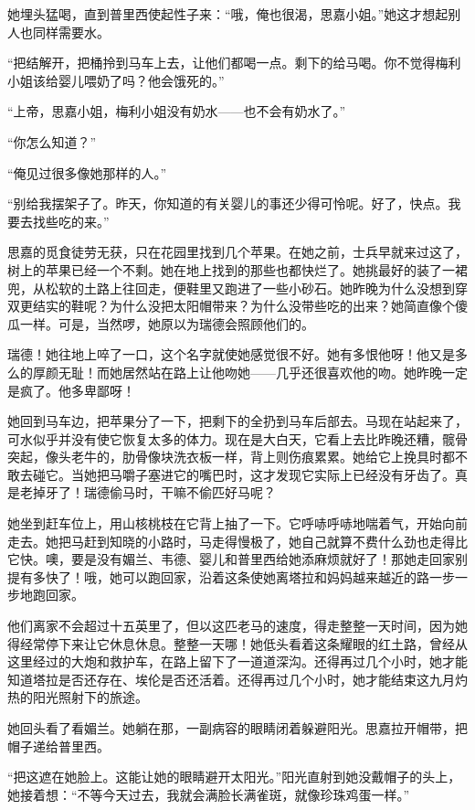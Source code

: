 \par 她埋头猛喝，直到普里西使起性子来：“哦，俺也很渴，思嘉小姐。”她这才想起别人也同样需要水。
\par “把结解开，把桶拎到马车上去，让他们都喝一点。剩下的给马喝。你不觉得梅利小姐该给婴儿喂奶了吗？他会饿死的。”
\par “上帝，思嘉小姐，梅利小姐没有奶水——也不会有奶水了。”
\par “你怎么知道？”
\par “俺见过很多像她那样的人。”
\par “别给我摆架子了。昨天，你知道的有关婴儿的事还少得可怜呢。好了，快点。我要去找些吃的来。”
\par 思嘉的觅食徒劳无获，只在花园里找到几个苹果。在她之前，士兵早就来过这了，树上的苹果已经一个不剩。她在地上找到的那些也都快烂了。她挑最好的装了一裙兜，从松软的土路上往回走，便鞋里又跑进了一些小砂石。她昨晚为什么没想到穿双更结实的鞋呢？为什么没把太阳帽带来？为什么没带些吃的出来？她简直像个傻瓜一样。可是，当然啰，她原以为瑞德会照顾他们的。
\par 瑞德！她往地上啐了一口，这个名字就使她感觉很不好。她有多恨他呀！他又是多么的厚颜无耻！而她居然站在路上让他吻她——几乎还很喜欢他的吻。她昨晚一定是疯了。他多卑鄙呀！
\par 她回到马车边，把苹果分了一下，把剩下的全扔到马车后部去。马现在站起来了，可水似乎并没有使它恢复太多的体力。现在是大白天，它看上去比昨晚还糟，髋骨突起，像头老牛的，肋骨像块洗衣板一样，背上则伤痕累累。她给它上挽具时都不敢去碰它。当她把马嚼子塞进它的嘴巴时，这才发现它实际上已经没有牙齿了。真是老掉牙了！瑞德偷马时，干嘛不偷匹好马呢？
\par 她坐到赶车位上，用山核桃枝在它背上抽了一下。它呼哧呼哧地喘着气，开始向前走去。她把马赶到知晓的小路时，马走得慢极了，她自己就算不费什么劲也走得比它快。噢，要是没有媚兰、韦德、婴儿和普里西给她添麻烦就好了！那她走回家别提有多快了！哦，她可以跑回家，沿着这条使她离塔拉和妈妈越来越近的路一步一步地跑回家。
\par 他们离家不会超过十五英里了，但以这匹老马的速度，得走整整一天时间，因为她得经常停下来让它休息休息。整整一天哪！她低头看着这条耀眼的红土路，曾经从这里经过的大炮和救护车，在路上留下了一道道深沟。还得再过几个小时，她才能知道塔拉是否还存在、埃伦是否还活着。还得再过几个小时，她才能结束这九月灼热的阳光照射下的旅途。
\par 她回头看了看媚兰。她躺在那，一副病容的眼睛闭着躲避阳光。思嘉拉开帽带，把帽子递给普里西。
\par “把这遮在她脸上。这能让她的眼睛避开太阳光。”阳光直射到她没戴帽子的头上，她接着想：“不等今天过去，我就会满脸长满雀斑，就像珍珠鸡蛋一样。”
